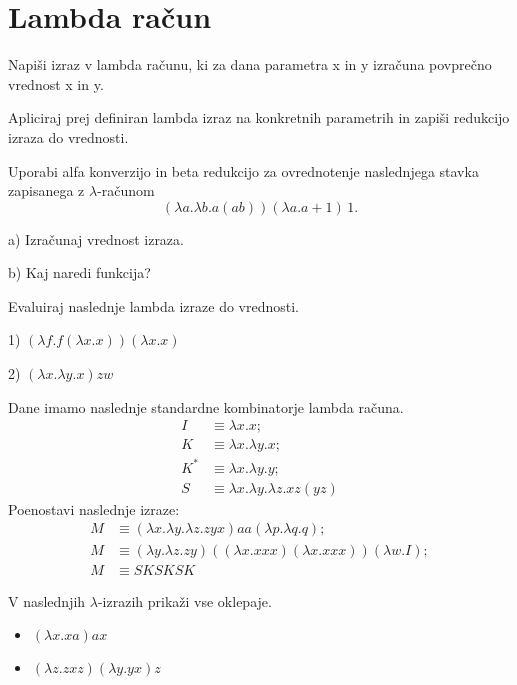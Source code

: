 \chapter{Lambda ra\v cun}

\begin{ex}
Napi\v si izraz v lambda ra\v cunu, ki za dana parametra x in y izra\v cuna povpre\v cno vrednost x in y.

Apliciraj prej definiran lambda izraz na konkretnih parametrih in zapi\v si redukcijo izraza do vrednosti.
\end{ex}
\begin{ex}
Uporabi alfa konverzijo in beta redukcijo za ovrednotenje naslednjega stavka zapisanega z $\lambda$-ra\v cunom
$$(\lambda a.\lambda b.a (a b)) (\lambda a.a + 1)\,1.$$

a) Izra\v cunaj vrednost izraza.

b) Kaj naredi funkcija?

\end{ex}
\begin{ex}
Evaluiraj naslednje lambda izraze do vrednosti.

1) $( \lambda f.f( \lambda x.x))( \lambda x.x) $

2) $( \lambda x. \lambda y.x) z w$

\end{ex}
\begin{ex}
Dane imamo naslednje standardne kombinatorje lambda ra\v cuna.
\begin{align*}
I& \equiv \lambda x.x;\\
K& \equiv \lambda x.\lambda y.x;\\
K^*& \equiv \lambda x.\lambda y.y;\\
S& \equiv \lambda x. \lambda y.\lambda z.xz(yz)
\end{align*}
Poenostavi naslednje izraze:
\begin{align*}
M &\equiv (\lambda x.\lambda y.\lambda z.zyx)aa(\lambda p.\lambda q.q);\\
M &\equiv (\lambda y.\lambda z.zy)((\lambda x.xxx)(\lambda x.xxx))(\lambda w.I);\\
M &\equiv SKSKSK
\end{align*}
\end{ex}
\begin{ex}
V naslednjih $\lambda$-izrazih prika\v zi vse oklepaje.  
\begin{itemize}
\item $(\lambda x.xa)ax$ 
\item $(\lambda z.zxz)(\lambda y.yx)z$ 
\end{itemize}
\end{ex}
